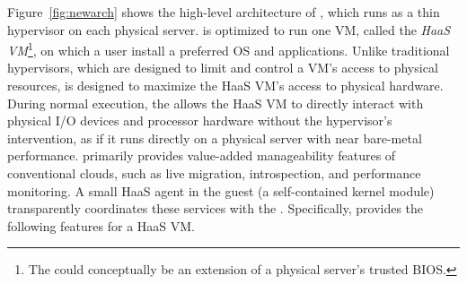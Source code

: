 Figure~\ref{fig:newarch} shows the high-level
architecture of \sna, which runs as a thin hypervisor on each
physical server. \na is optimized to run one VM, called the 
{\em HaaS VM}\footnote{The \na could conceptually be an extension of a physical server's trusted BIOS.}, 
on which  a user install a preferred OS and applications. 
Unlike traditional hypervisors, which are designed to limit and control a VM's 
access to physical resources, \na is designed to maximize the HaaS VM's 
access to physical hardware.
During normal execution, the \na allows 
the HaaS VM to directly interact with physical I/O devices and processor hardware
without the hypervisor's intervention, 
as if it runs directly on a physical server with near bare-metal performance.
\na primarily provides value-added manageability 
features of conventional clouds, such as live
migration, introspection, and performance monitoring.
A small HaaS agent in the guest (a self-contained kernel module)
transparently coordinates these services with the \sna.
Specifically, \na provides the following features for a HaaS VM. 

